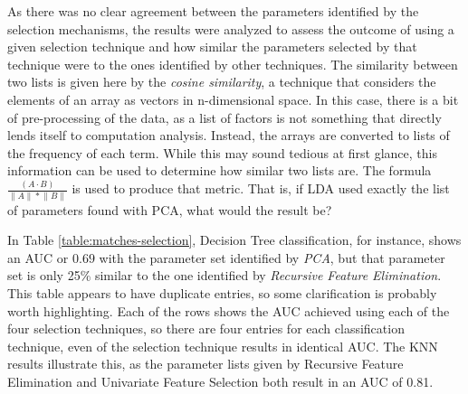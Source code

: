 \documentclass[letterpaper]{report}
\begin{document}
As there was no clear agreement between the parameters identified by the selection mechanisms, the results were analyzed to assess the outcome of using a given selection technique and how similar the parameters selected by that technique were to the ones identified by other techniques.  The similarity between two lists is given here by the \textit{cosine similarity}, a technique that considers the elements of an array as vectors in n-dimensional space. In this case, there is a bit of pre-processing of the data, as a list of factors is not something that directly lends itself to computation analysis. Instead, the arrays are converted to lists of the frequency of each term. While this may sound tedious at first glance, this information can be used to determine how similar two lists are. The formula $\frac {(A \cdot B)} { \lVert A \rVert * \lVert B \rVert }$ is used to produce that metric. That is, if LDA used exactly the list of parameters found with PCA, what would the result be?

In Table \ref{table:matches-selection}, Decision Tree classification, for instance, shows an AUC or $0.69$ with the parameter set identified by \textit{PCA}, but that parameter set is only 25\% similar to the one identified by \textit{Recursive Feature Elimination}.  This table appears to have duplicate entries, so some clarification is probably worth highlighting. Each of the rows shows the AUC achieved using each of the four selection techniques, so there are four entries for each classification technique, even of the selection technique results in identical AUC. The KNN results illustrate this, as the parameter lists given by Recursive Feature Elimination and Univariate Feature Selection both result in an AUC of 0.81.
\end{document}

